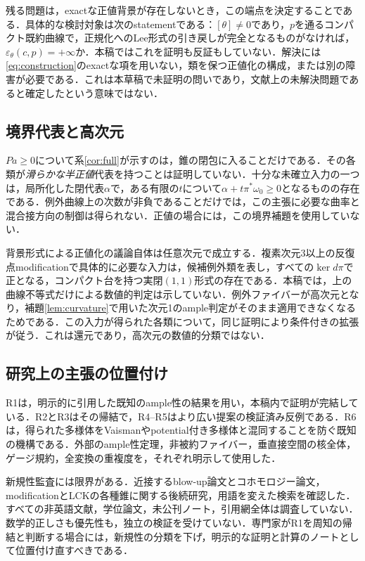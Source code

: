 \documentclass[12pt]{amsart}
\theoremstyle{definition}
\theoremstyle{remark}
\numberwithin{equation}{section}
\begin{document}
残る問題は，exactな正値背景が存在しないとき，この端点を決定することである．具体的な検討対象は次のstatementである：$[\theta]\ne0$であり，$p$を通るコンパクト既約曲線で，正規化へのLee形式の引き戻しが完全となるものがなければ，$\varepsilon_\theta(c,p)=+\infty$か．本稿ではこれを証明も反証もしていない．解決には\eqref{eq:construction}のexactな項を用いない，類を保つ正値化の構成，または別の障害が必要である．これは本草稿で未証明の問いであり，文献上の未解決問題であると確定したという意味ではない．

\subsection{境界代表と高次元}
$Pa\geq0$について系\ref{cor:full}が示すのは，錐の閉包に入ることだけである．その各類が\emph{滑らかな半正値}代表を持つことは証明していない．十分な未確立入力の一つは，局所化した閉代表$\alpha$で，ある有限の$t$について$\alpha+t\pi^*\omega_0\geq0$となるものの存在である．例外曲線上の次数が非負であることだけでは，この主張に必要な曲率と混合接方向の制御は得られない．正値の場合には，この境界補題を使用していない．

背景形式による正値化の議論自体は任意次元で成立する．複素次元3以上の反復点modificationで具体的に必要な入力は，候補例外類を表し，すべての$\ker d\pi$で正となる，コンパクト台を持つ実閉$(1,1)$形式の存在である．本稿では，上の曲線不等式だけによる数値的判定は示していない．例外ファイバーが高次元となり，補題\ref{lem:curvature}で用いた次元1のample判定がそのまま適用できなくなるためである．この入力が得られた各類について，同じ証明により条件付きの拡張が従う．これは還元であり，高次元の数値的分類ではない．

\subsection{研究上の主張の位置付け}
R1は，明示的に引用した既知のample性の結果を用い，本稿内で証明が完結している．R2とR3はその帰結で，R4--R5はより広い提案の検証済み反例である．R6は，得られた多様体をVaismanやpotential付き多様体と混同することを防ぐ既知の機構である．外部のample性定理，非被約ファイバー，垂直接空間の核全体，ゲージ規約，全変換の重複度を，それぞれ明示して使用した．

新規性監査には限界がある．近接するblow-up論文とコホモロジー論文，modificationとLCKの各種錐に関する後続研究，用語を変えた検索を確認した．すべての非英語文献，学位論文，未公刊ノート，引用網全体は調査していない．数学的正しさも優先性も，独立の検証を受けていない．専門家がR1を周知の帰結と判断する場合には，新規性の分類を下げ，明示的な証明と計算のノートとして位置付け直すべきである．
\end{document}
